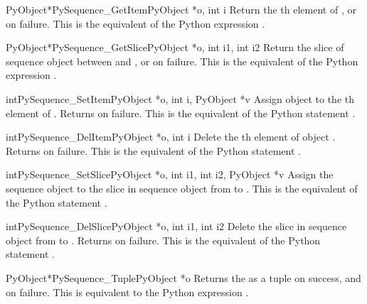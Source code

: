 \begin{cfuncdesc}{PyObject*}{PySequence_GetItem}{PyObject *o, int i}
  Return the th element of , or \NULL{} on failure.
  This is the equivalent of the Python expression
  .
\end{cfuncdesc}


\begin{cfuncdesc}{PyObject*}{PySequence_GetSlice}{PyObject *o, int i1, int i2}
  Return the slice of sequence object  between  and
  , or \NULL{} on failure. This is the equivalent of the
  Python expression .
\end{cfuncdesc}


\begin{cfuncdesc}{int}{PySequence_SetItem}{PyObject *o, int i, PyObject *v}
  Assign object  to the th element of .  Returns
   on failure.  This is the equivalent of the Python
  statement .
\end{cfuncdesc}

\begin{cfuncdesc}{int}{PySequence_DelItem}{PyObject *o, int i}
  Delete the th element of object .  Returns 
  on failure.  This is the equivalent of the Python statement
  .
\end{cfuncdesc}

\begin{cfuncdesc}{int}{PySequence_SetSlice}{PyObject *o, int i1,
                                            int i2, PyObject *v}
  Assign the sequence object  to the slice in sequence object
   from  to .  This is the equivalent of the
  Python statement .
\end{cfuncdesc}

\begin{cfuncdesc}{int}{PySequence_DelSlice}{PyObject *o, int i1, int i2}
  Delete the slice in sequence object  from  to
  .  Returns  on failure.  This is the equivalent of
  the Python statement .
\end{cfuncdesc}

\begin{cfuncdesc}{PyObject*}{PySequence_Tuple}{PyObject *o}
  Returns the  as a tuple on success, and \NULL{} on failure.
  This is equivalent to the Python expression .
\end{cfuncdesc}

